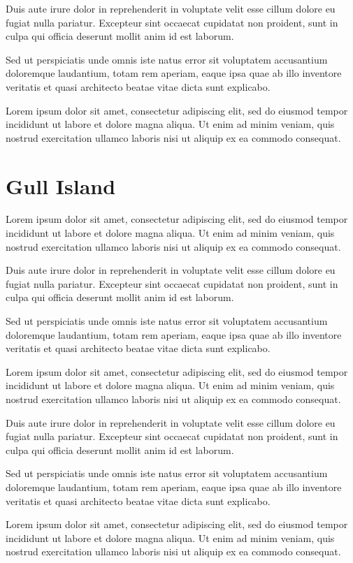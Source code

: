 \documentclass{memoir}
\begin{document}
Duis aute irure dolor in reprehenderit in voluptate velit esse cillum dolore eu fugiat nulla pariatur. Excepteur sint occaecat cupidatat non proident, sunt in culpa qui officia deserunt mollit anim id est laborum.

Sed ut perspiciatis unde omnis iste natus error sit voluptatem accusantium doloremque laudantium, totam rem aperiam, eaque ipsa quae ab illo inventore veritatis et quasi architecto beatae vitae dicta sunt explicabo.

Lorem ipsum dolor sit amet, consectetur adipiscing elit, sed do eiusmod tempor incididunt ut labore et dolore magna aliqua. Ut enim ad minim veniam, quis nostrud exercitation ullamco laboris nisi ut aliquip ex ea commodo consequat.
\section{Gull Island}
Lorem ipsum dolor sit amet, consectetur adipiscing elit, sed do eiusmod tempor incididunt ut labore et dolore magna aliqua. Ut enim ad minim veniam, quis nostrud exercitation ullamco laboris nisi ut aliquip ex ea commodo consequat.

Duis aute irure dolor in reprehenderit in voluptate velit esse cillum dolore eu fugiat nulla pariatur. Excepteur sint occaecat cupidatat non proident, sunt in culpa qui officia deserunt mollit anim id est laborum.

Sed ut perspiciatis unde omnis iste natus error sit voluptatem accusantium doloremque laudantium, totam rem aperiam, eaque ipsa quae ab illo inventore veritatis et quasi architecto beatae vitae dicta sunt explicabo.

Lorem ipsum dolor sit amet, consectetur adipiscing elit, sed do eiusmod tempor incididunt ut labore et dolore magna aliqua. Ut enim ad minim veniam, quis nostrud exercitation ullamco laboris nisi ut aliquip ex ea commodo consequat.

Duis aute irure dolor in reprehenderit in voluptate velit esse cillum dolore eu fugiat nulla pariatur. Excepteur sint occaecat cupidatat non proident, sunt in culpa qui officia deserunt mollit anim id est laborum.

Sed ut perspiciatis unde omnis iste natus error sit voluptatem accusantium doloremque laudantium, totam rem aperiam, eaque ipsa quae ab illo inventore veritatis et quasi architecto beatae vitae dicta sunt explicabo.

Lorem ipsum dolor sit amet, consectetur adipiscing elit, sed do eiusmod tempor incididunt ut labore et dolore magna aliqua. Ut enim ad minim veniam, quis nostrud exercitation ullamco laboris nisi ut aliquip ex ea commodo consequat.
\end{document}
